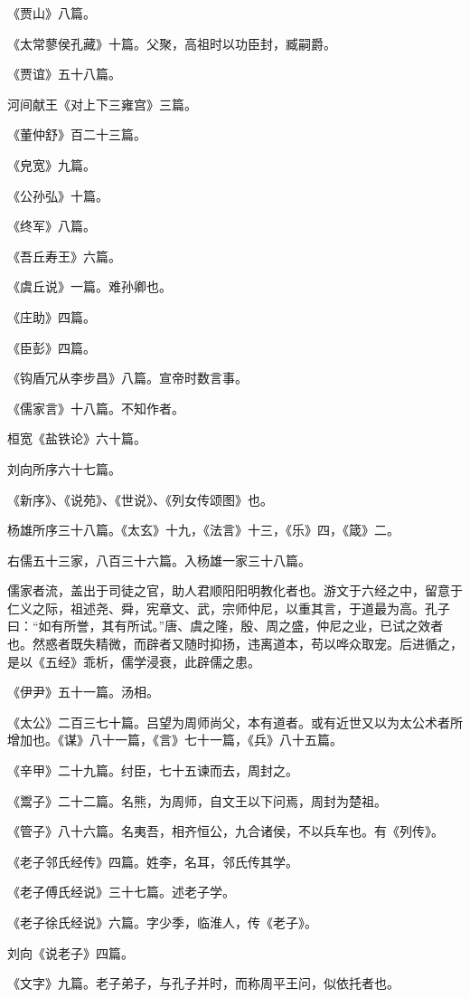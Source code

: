 \documentclass[]{article}
\begin{document}
《贾山》八篇。

《太常蓼侯孔藏》十篇。父聚，高祖时以功臣封，臧嗣爵。

《贾谊》五十八篇。

河间献王《对上下三雍宫》三篇。

《董仲舒》百二十三篇。

《皃宽》九篇。

《公孙弘》十篇。

《终军》八篇。

《吾丘寿王》六篇。

《虞丘说》一篇。难孙卿也。

《庄助》四篇。

《臣彭》四篇。

《钩盾冗从李步昌》八篇。宣帝时数言事。

《儒家言》十八篇。不知作者。

桓宽《盐铁论》六十篇。

刘向所序六十七篇。

《新序》、《说苑》、《世说》、《列女传颂图》也。

杨雄所序三十八篇。《太玄》十九，《法言》十三，《乐》四，《箴》二。

右儒五十三家，八百三十六篇。入杨雄一家三十八篇。

儒家者流，盖出于司徒之官，助人君顺阳阳明教化者也。游文于六经之中，留意于仁义之际，祖述尧、舜，宪章文、武，宗师仲尼，以重其言，于道最为高。孔子曰：``如有所誉，其有所试。''唐、虞之隆，殷、周之盛，仲尼之业，已试之效者也。然惑者既失精微，而辟者又随时抑扬，违离道本，苟以哗众取宠。后进循之，是以《五经》乖析，儒学浸衰，此辟儒之患。

《伊尹》五十一篇。汤相。

《太公》二百三七十篇。吕望为周师尚父，本有道者。或有近世又以为太公术者所增加也。《谋》八十一篇，《言》七十一篇，《兵》八十五篇。

《辛甲》二十九篇。纣臣，七十五谏而去，周封之。

《鬻子》二十二篇。名熊，为周师，自文王以下问焉，周封为楚祖。

《管子》八十六篇。名夷吾，相齐恒公，九合诸侯，不以兵车也。有《列传》。

《老子邻氏经传》四篇。姓李，名耳，邻氏传其学。

《老子傅氏经说》三十七篇。述老子学。

《老子徐氏经说》六篇。字少季，临淮人，传《老子》。

刘向《说老子》四篇。

《文字》九篇。老子弟子，与孔子并时，而称周平王问，似依托者也。
\end{document}
